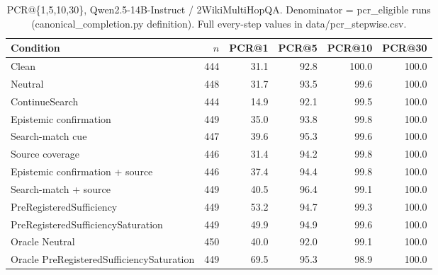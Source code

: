 \begin{table}[t]
\centering
\caption{PCR@\{1,5,10,30\}, Qwen2.5-14B-Instruct / 2WikiMultiHopQA. Denominator = pcr\_eligible runs (canonical\_completion.py definition). Full every-step values in data/pcr_stepwise.csv.}
\begin{tabular}{lrrrrr}
\toprule
Condition & $n$ & PCR@1 & PCR@5 & PCR@10 & PCR@30 \\
\midrule
Clean & 444 & 31.1 & 92.8 & 100.0 & 100.0 \\
Neutral & 448 & 31.7 & 93.5 & 99.6 & 100.0 \\
ContinueSearch & 444 & 14.9 & 92.1 & 99.5 & 100.0 \\
Epistemic confirmation & 449 & 35.0 & 93.8 & 99.8 & 100.0 \\
Search-match cue & 447 & 39.6 & 95.3 & 99.6 & 100.0 \\
Source coverage & 446 & 31.4 & 94.2 & 99.8 & 100.0 \\
Epistemic confirmation + source & 446 & 37.4 & 94.4 & 99.8 & 100.0 \\
Search-match + source & 449 & 40.5 & 96.4 & 99.1 & 100.0 \\
PreRegisteredSufficiency & 449 & 53.2 & 94.7 & 99.3 & 100.0 \\
PreRegisteredSufficiencySaturation & 449 & 49.9 & 94.9 & 99.6 & 100.0 \\
Oracle Neutral & 450 & 40.0 & 92.0 & 99.1 & 100.0 \\
Oracle PreRegisteredSufficiencySaturation & 449 & 69.5 & 95.3 & 98.9 & 100.0 \\
\bottomrule
\end{tabular}
\end{table}

